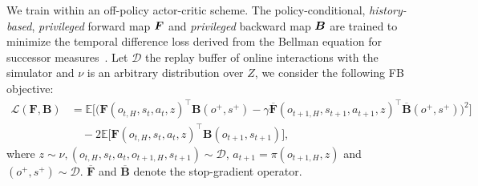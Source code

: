 We train \method{} within an off-policy actor-critic scheme.
The policy-conditional, \emph{history-based}, \emph{privileged} forward map $\boldsymbol{F}$ and \textit{privileged} backward map $\boldsymbol{B}$ are trained to minimize the
temporal difference loss derived from the  Bellman equation for successor measures~\citep{Touati21fb}. Let $\mathcal{D}$ the replay buffer of online interactions with the simulator and $\nu$ is an arbitrary distribution over $Z$, we consider the following FB objective:
\begin{align*}\label{eq:fb.loss}
    \mathcal{L}(\boldsymbol{F},\boldsymbol{B}) &= \mathbb{E} \Big[ \big( \boldsymbol{F}(o_{t, H},s_t, a_t, z)^\top \boldsymbol{B}(o^{+}, s^{+}) - \gamma \overline{\boldsymbol{F}}(o_{t+1, H},s_{t+1}, a_{t+1}, z)^\top \overline{\boldsymbol{B}}(o^{+}, s^{+})\big)^2 \Big] \\
    &\quad - 2 \mathbb{E}\big[ \boldsymbol{F}(o_{t, H},s_t, a_t, z)^\top \boldsymbol{B}(o_{t+1}, s_{t+1}) \big],\nonumber
\end{align*}
where $z\sim \nu, (o_{t, H},s_t, a_t, o_{t+1, H},s_{t+1}) \sim \mathcal{D}$, $a_{t+1} = \pi(o_{t+1, H}, z)$ and $(o^{+}, s^{+}) \sim \mathcal{D}$. $\overline{\boldsymbol{F}}$ and $\overline{\boldsymbol{B}}$ denote the stop-gradient operator.


